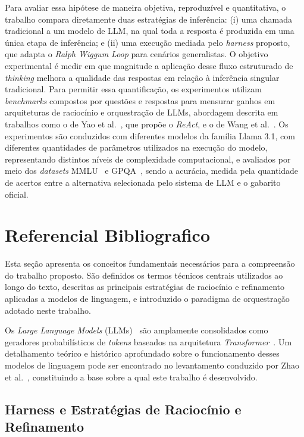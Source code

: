 \documentclass[a4paper,10pt,twocolumn]{article}
\begin{document}
Para avaliar essa hipótese de maneira objetiva, reproduzível e quantitativa, o trabalho compara diretamente duas estratégias de inferência: (i) uma chamada tradicional a um modelo de LLM, na qual toda a resposta é produzida em uma única etapa de inferência; e (ii) uma execução mediada pelo \textit{harness} proposto, que adapta o \textit{Ralph Wiggum Loop} para cenários generalistas. O objetivo experimental é medir em que magnitude a aplicação desse fluxo estruturado de \textit{thinking} melhora a qualidade das respostas em relação à inferência singular tradicional. Para permitir essa quantificação, os experimentos utilizam \textit{benchmarks} compostos por questões e respostas para mensurar ganhos em arquiteturas de raciocínio e orquestração de LLMs, abordagem descrita em trabalhos como o de Yao et al.~\cite{yao2022react}, que propõe o \textit{ReAct}, e o de Wang et al.~\cite{wang2025beyond}. Os experimentos são conduzidos com diferentes modelos da família Llama 3.1, com diferentes quantidades de parâmetros utilizados na execução do modelo, representando distintos níveis de complexidade computacional, e avaliados por meio dos \textit{datasets} MMLU~\cite{hendrycks2021measuring} e GPQA~\cite{rein2023gpqa}, sendo a acurácia, medida pela quantidade de acertos entre a alternativa selecionada pelo sistema de LLM e o gabarito oficial.
\section{Referencial Bibliografico}

Esta seção apresenta os conceitos fundamentais necessários para a compreensão do trabalho proposto. São definidos os termos técnicos centrais utilizados ao longo do texto, descritas as principais estratégias de raciocínio e refinamento aplicadas a modelos de linguagem, e introduzido o paradigma de orquestração adotado neste trabalho.

Os \textit{Large Language Models} (LLMs)~\cite{brown2020language} são amplamente consolidados como geradores probabilísticos de \textit{tokens} baseados na arquitetura \textit{Transformer}~\cite{vaswani2017attention}. Um detalhamento teórico e histórico aprofundado sobre o funcionamento desses modelos de linguagem pode ser encontrado no levantamento conduzido por Zhao et al.~\cite{zhao2023survey}, constituindo a base sobre a qual este trabalho é desenvolvido.

\subsection{Harness e Estratégias de Raciocínio e Refinamento}
\end{document}
